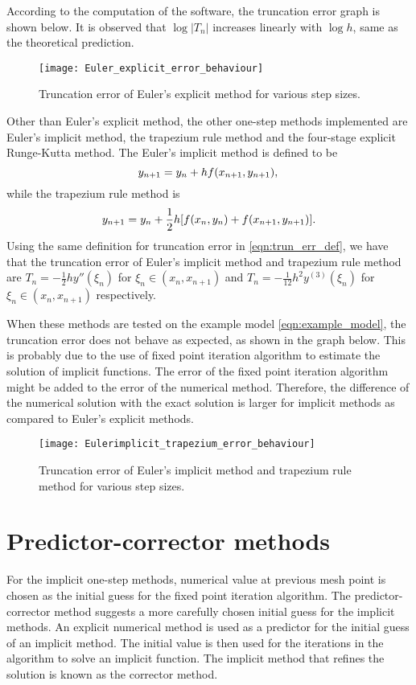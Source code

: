 According to the computation of the software, the truncation error graph is shown below. It is observed that $\log |T_n|$ increases linearly with $\log h$, same as the theoretical prediction. 

\begin{figure}
    \texttt{[image: Euler\_explicit\_error\_behaviour]}
    \caption{Truncation error of Euler's explicit method for various step sizes.}
    \label{fig:Euler_explicit_error_behaviour}
\end{figure}

Other than Euler's explicit method, the other one-step methods implemented are Euler's implicit method, the trapezium rule method and the four-stage explicit Runge-Kutta method. The Euler's implicit method is defined to be
\begin{equation}
    y_{n+1} = y_n + hf(x_{n+1},y_{n+1}),\\
\end{equation}
while the trapezium rule method is
\begin{equation}
    y_{n+1} = y_n + \frac{1}{2}h[f(x_n,y_n) + f(x_{n+1},y_{n+1})].\\
\end{equation}
Using the same definition for truncation error in \ref{eqn:trun_err_def}, we have that the truncation error of Euler's implicit method and trapezium rule method are $T_n = -\frac{1}{2}hy''(\xi_n)$ for $\xi_n \in (x_n, x_{n+1})$ and $T_n = -\frac{1}{12}h^2y^{(3)}(\xi_n)$ for $\xi_n \in (x_n, x_{n+1})$ respectively.

When these methods are tested on the example model \ref{eqn:example_model}, the truncation error does not behave as expected, as shown in the graph below. This is probably due to the use of fixed point iteration algorithm to estimate the solution of implicit functions. The error of the fixed point iteration algorithm might be added to the error of the numerical method. Therefore, the difference of the numerical solution with the exact solution is larger for implicit methods as compared to Euler's explicit methods.

\begin{figure}
    \texttt{[image: Eulerimplicit\_trapezium\_error\_behaviour]}
    \caption{Truncation error of Euler's implicit method and trapezium rule method for various step sizes.}
    \label{fig:Eulerimplicit_trapezium_error_behaviour}
\end{figure}

\section{Predictor-corrector methods}
\label{sec:predictor-corrector}
For the implicit one-step methods, numerical value at previous mesh point is chosen as the initial guess for the fixed point iteration algorithm. The predictor-corrector method suggests a more carefully chosen initial guess for the implicit methods. An explicit numerical method is used as a predictor for the initial guess of an implicit method. The initial value is then used for the iterations in the algorithm to solve an implicit function. The implicit method that refines the solution is known as the corrector method. 

